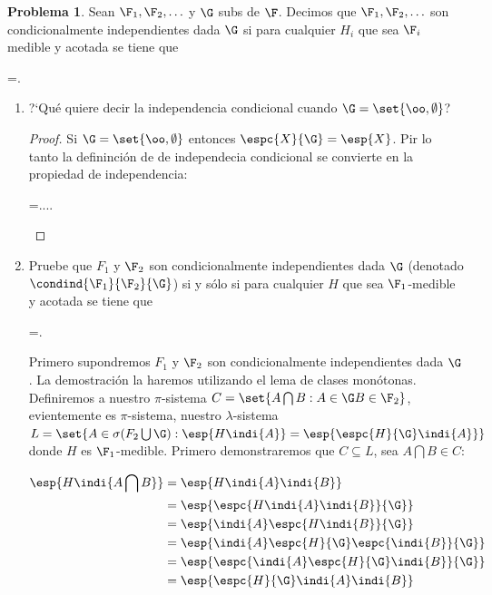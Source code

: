 \documentclass[a5paper,oneside]{amsart}
\theoremstyle{plain}
\theoremstyle{definition}
\newtheorem{problema}{Problema}
\begin{document}
\begin{problema}
Sean $\F_1,\F_2,\ldots $ y $\G$ sub\sa s de $\F$. Decimos que $\F_1,\F_2,\ldots$ son condicionalmente independientes dada $\G$ si para cualquier $H_i$ que sea $\F_i$ medible y acotada se tiene que\begin{esn}
=\cdots {}.
\end{esn}
\begin{enumerate}
\item ?`Qu\'e quiere decir la independencia condicional cuando $\G=\set{\oo,\emptyset}$?
\begin{proof}

Si $\G=\set{\oo,\emptyset}$ entonces $\espc{X}{\G}=\esp{X}$. Pir lo tanto la defininci\'on de de independecia condicional se convierte en la propiedad de independencia:
\begin{esn}
=....
\end{esn}

\end{proof}

\item Pruebe que $F_1$ y $\F_2$ son condicionalmente independientes dada $\G$ (denotado $\condind{\F_1}{\F_2}{\G}$) si y s\'olo si para cualquier $H$ que sea $\F_1$-medible y acotada se tiene que\begin{esn}
=.
\end{esn}

Primero supondremos $F_1$ y $\F_2$ son condicionalmente independientes dada $\G$. La demostraci\'on la haremos utilizando el lema de clases mon\'otonas. Definiremos a nuestro $\pi$-sistema $C=\set{A\bigcap B: A\in \G B\in \F_2}$, evientemente es $\pi$-sistema, nuestro $\lambda$-sistema $L=\set{A\in\sigma(F_2\bigcup\G):\esp{H\indi{A}}=\esp{\espc{H}{\G}\indi{A} } } $ donde $H$ es $\F_1$-medible. Primero demonstraremos que $C\subseteq L$, sea $A\bigcap B\in C$:

\begin{align}
\esp{H\indi{A\bigcap B}} &=\esp{H\indi{A}\indi{ B}}\notag \\
&=\esp{\espc{H\indi{A}\indi{ B}}{\G}}\notag \\
&=\esp{\indi{A}\espc{H\indi{ B}}{\G}} \notag \\
&=\esp{\indi{A}\espc{H}{\G}\espc{\indi{ B}}{\G}}\notag \\
&=\esp{\espc{\indi{A}\espc{H}{\G}\indi{ B}}{\G}}\notag \\
&=\esp{\espc{H}{\G}\indi{A}\indi{ B}}\notag
\end{align}


\end{enumerate}
\end{problema}
\end{document}
